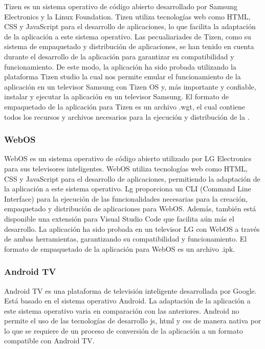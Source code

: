 Tizen \cite{Tizen} es un sistema operativo de código abierto desarrollado por Samsung Electronics y la Linux
Foundation. Tizen utiliza tecnologías web como HTML, CSS y JavaScript para el desarrollo de
aplicaciones, lo que facilita la adaptación de la aplicación a este sistema operativo. Las pecualiariades
de Tizen, como su sistema de empaquetado y distribución de aplicaciones, se han tenido en cuenta
durante el desarrollo de la aplicación para garantizar su compatibilidad y funcionamiento. De este modo,
la aplicación ha sido probada utilizando la plataforma Tizen studio la cual nos permite emular el
funcionamiento de la aplicación en un televisor Samsung con Tizen OS y, más importante y confiable, 
instalar y ejecutar la aplicación en un televisor Samsung. El formato de empaquetado de la aplicación
para Tizen es un archivo .wgt, el cual contiene todos los recursos y archivos necesarios para la
ejecución y distribución de la .

\subsubsection{WebOS}
\label{subsubsec:adaptabilidad_webos}

WebOS \cite{WebOS} es un sistema operativo de código abierto utilizado por LG Electronics para sus televisores
inteligentes. WebOS utiliza tecnologías web como HTML, CSS y JavaScript para el desarrollo de
aplicaciones, permitiendo la adaptación de la aplicación a este sistema operativo. Lg proporciona
un CLI (Command Line Interface) para la ejecución de las funcionalidades necesarias para la creación, 
empaquetado y distribución de aplicaciones para WebOS. Además, también está disponible una extensión para
Visual Studio Code que facilita aún más el desarrollo. La aplicación ha sido probada en un televisor LG
con WebOS a través de ambas herramientas, garantizando su compatibilidad y funcionamiento. El formato de
empaquetado de la aplicación para WebOS es un archivo .ipk.

\subsubsection{Android TV}
\label{subsubsec:adaptabilidad_android_tv}

Android TV \cite{AndroidTV} es una plataforma de televisión inteligente desarrollada por Google. Está basado
en el sistema operativo Android. La adaptación de la aplicación a este sistema operativo varia en comparación
con las anteriores. Android no permite el uso de las tecnologías de desarrollo js, html y css de manera nativa
por lo que se requiere de un proceso de conversión de la aplicación a un formato compatible con Android TV.

